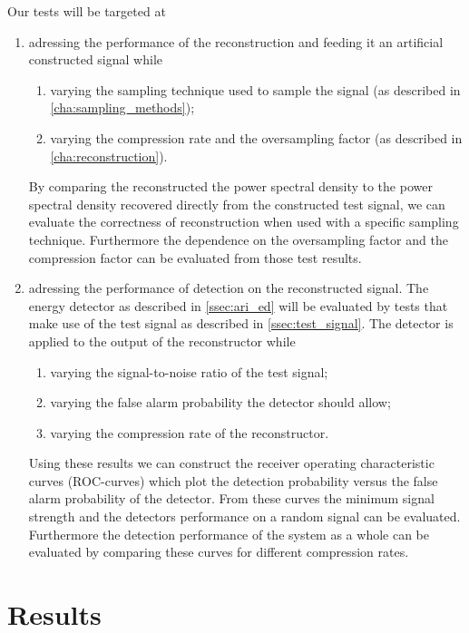 \documentclass[a4paper, openany, oneside]{memoir}
\begin{document}
Our tests will be targeted at
\begin{enumerate}
	\item adressing the performance of the reconstruction and feeding it an artificial constructed signal while
	\begin{enumerate}
		\item varying the sampling technique used to sample the signal (as described in \cref{cha:sampling_methods});
		\item varying the compression rate and the oversampling factor (as described in \cref{cha:reconstruction}).
	\end{enumerate}
	By comparing the reconstructed the power spectral density to the power spectral density recovered directly from the constructed test signal, we can evaluate the correctness of reconstruction when used with a specific sampling technique.
	Furthermore the dependence on the oversampling factor and the compression factor can be evaluated from those test results. 
	\item adressing the performance of detection on the reconstructed signal. The energy detector as described in \cref{ssec:ari_ed} will be evaluated by tests that make use of the test signal as described in \cref{ssec:test_signal}. 
	The detector is applied to the output of the reconstructor while	
	\begin{enumerate}
		\item varying the signal-to-noise ratio of the test signal; 
		\item varying the false alarm probability the detector 
		should allow;
		\item varying the compression rate of the reconstructor.
	\end{enumerate}
	Using these results we can construct the receiver operating characteristic curves (ROC-curves) which plot the detection probability versus the false alarm probability of the detector. From these curves the minimum signal strength and the detectors performance on a random signal can be evaluated. Furthermore the detection performance of the system as a whole can be evaluated by comparing these curves for different compression rates.
	\end{enumerate}

\section{Results}
\end{document}
